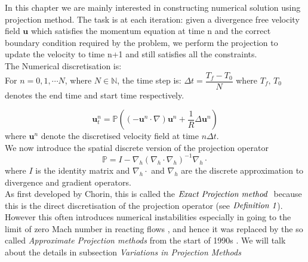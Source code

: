In this chapter we are mainly interested in constructing numerical solution using projection method. The task is at each iteration: given a divergence free velocity field $\textbf{u}$ which satisfies the momentum equation at time n and the correct boundary condition required by the problem, we perform the projection to update the velocity to time n+1 and still satisfies all the constraints.\\

The Numerical discretisation is:\\
For $n = 0,1,\cdots N$, where $N \in \mathbb{N}$, the time step is: $\Delta t = \dfrac{T_f - T_0}{N}$ where $T_f,\,T_0$ denotes the end time and start time respectively.

\begin{equation}\label{eq:discrete projection on momentum equation}
\textbf{u}^n_t = \mathbb{P} ((-\textbf{u}^{n} \cdot \nabla) \textbf{u}^{n} + \dfrac{1}{R} \Delta \textbf{u}^n)
\end{equation}
where $\textbf{u}^n$ denote the discretised velocity field at time $n\Delta t$.\\
We now introduce the spatial discrete version of the projection operator
\begin{equation}\label{eq: discrete projection opreator}
\mathbb{P} = I - \nabla_h (\nabla_h \cdot \nabla_h)^{-1} \nabla_h \cdot
\end{equation}
where $\textit{I}$ is the identity matrix and $\nabla_h \cdot$ and $\nabla_h$ are the discrete approximation to divergence and gradient operators.\\

As first developed by Chorin, this is called the $\emph{Exact Projection method }$ \cite{chorin1968numerical,almgren1996numerical,almgren2000approximate} because this is the direct discretisation of the projection operator (see $\emph{Definition 1}$). However this often introduces numerical instabilities especially in going to the limit of zero Mach number in reacting flows \cite{almgren1996numerical,almgren2000approximate,lal1993projection,minion1996projection}, and hence it was replaced by the so called \emph{Approximate Projection methods} from the start of 1990s 
\cite{brown2001accurate,almgren1996numerical,almgren2000approximate}. We will talk about the details in subsection \textit{Variations in Projection Methods}\\

